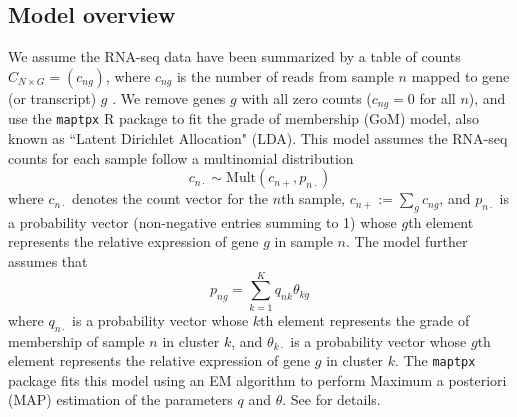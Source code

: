 \subsection{Model overview}

We assume the RNA-seq data have been summarized by a table of counts $C_{N \times G} = (c_{ng})$, where $c_{ng}$ is the number of reads from sample $n$ mapped to gene (or transcript) $g$ \cite{oshlack.etal.genomebiology}.  We remove genes $g$ with all zero counts ($c_{ng}=0$ for all $n$), and
use the {\tt maptpx} R package \cite{taddy} to fit the grade of membership (GoM) model, also known as ``Latent Dirichlet Allocation" (LDA). 
This model assumes the RNA-seq counts for each sample follow a multinomial distribution
\begin{equation}
c_{n\cdot} \sim \text{Mult}(c_{n+}, p_{n\cdot})
\end{equation}
where $c_{n\cdot}$ denotes the count vector for the $n$th sample, $c_{n+} := \sum_g c_{ng}$, and $p_{n\cdot}$ is a probability vector (non-negative entries summing to 1) whose $g$th element represents the relative expression of gene $g$ in sample $n$. 
The model further assumes that 
\begin{equation}
p_{ng} = \sum_{k=1}^{K} q_{nk}\theta_{kg}    
\end{equation}
where $q_{n\cdot}$ is a probability vector whose $k$th element represents the grade of membership of
sample $n$ in cluster $k$, and $\theta_{k\cdot}$ is a probability vector whose $g$th element represents
the relative expression of gene $g$ in cluster $k$. The {\tt maptpx} package fits this model using an EM algorithm to perform Maximum a posteriori (MAP)  estimation of the parameters $q$ and $\theta$. See \cite{Taddy2012} for details.


%
%

